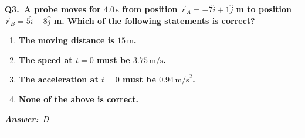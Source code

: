 \documentclass[11pt]{article}
\newcommand{\QuestionStyle}[1]{{\large\bfseries\boldmath #1}}
\newcommand{\AnswerStyle}[1]{{\large\bfseries\boldmath #1}}
\newcommand{\ReasonStyle}[1]{{\normalsize #1}}
\newif\ifshowreason
\newcommand{\Correct}[2]{%
  \item \AnswerStyle{\textcolor{AnsRed}{#1}}%
  \ifshowreason\\[-0.2em]
    \ReasonStyle{\textcolor{AnsRed}{#2}}%
  \fi
}
\newcommand{\Wrong}[2]{%
  \item \AnswerStyle{\textcolor{WrongBlue}{#1}}%
  \ifshowreason\\[-0.2em]
    \ReasonStyle{\textcolor{WrongBlue}{#2}}%
  \fi
}
\newcommand{\QBlock}[4]{%
  \Needspace{8\baselineskip}%
  \noindent
  \begin{minipage}{\linewidth}
    \QuestionStyle{#1.~#2}

    \vspace{0.25em}
    \begin{enumerate}
      #3
    \end{enumerate}

    \vspace{0.1em}
    \noindent\textcolor{AnsRed}{\textit{\textbf{Answer:}~#4}}

    \vspace{0.25em}
    \hrule height 0.4pt
  \end{minipage}
  \vspace{0.75em}
}
\begin{document}
\QBlock{Q3}{A probe moves for \(4.0\,\text{s}\) from position \(\vec r_A=-7\hat i+1\hat j\) m to position \(\vec r_B=5\hat i-8\hat j\) m. Which of the following statements is correct?}{
\Wrong{The moving distance is \(15\,\text{m}\).}{\(15\,\text{m}\) is the magnitude of the displacement, since \(|\Delta \vec r|=\sqrt{12^2+(-9)^2}=15\,\text{m}\). The actual distance traveled depends on the path taken, which is not given.}
\Wrong{The speed at \(t=0\) must be \(3.75\,\text{m/s}\).}{This divides displacement magnitude by elapsed time and then mistakes that result for the initial speed. Average rate based on endpoints does not determine the instantaneous speed at the start.}
\Wrong{The acceleration at \(t=0\) must be \(0.94\,\text{m/s}^2\).}{This assigns a unique acceleration from only two positions and a time interval. Many different motions with different accelerations could connect the same endpoints in \(4.0\,\text{s}\).}
\Correct{None of the above is correct.}{The displacement is \(\Delta \vec r=(5-(-7))\hat i+(-8-1)\hat j=12\hat i-9\hat j\), whose magnitude is \(|\Delta \vec r|=\sqrt{12^2+(-9)^2}=15\,\text{m}\). But that value is not necessarily the distance traveled, and neither the initial speed nor the acceleration at \(t=0\) can be determined uniquely from only the initial position, final position, and elapsed time.}
}{D}
\end{document}
